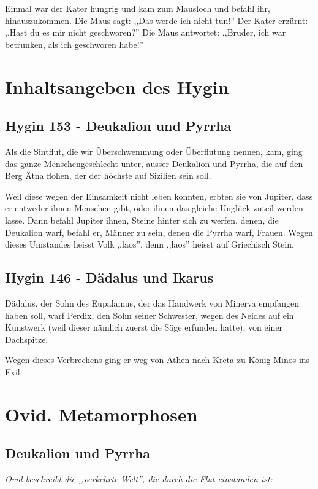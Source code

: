 \documentclass[a4paper]{article}
\begin{document}
Einmal war der Kater hungrig und kam zum Mausloch und befahl ihr, hinauszukommen. Die Maus sagt: ,,Das werde ich nicht tun!'' Der Kater erzürnt: ,,Hast du es mir nicht geschworen?'' Die Maus antwortet: ,,Bruder, ich war betrunken, als ich geschworen habe!''

\section{Inhaltsangeben des Hygin}
\subsection{Hygin 153 - Deukalion und Pyrrha}
Als die Sintflut, die wir Überschwemmung oder Überflutung nennen, kam, ging das ganze Menschengeschlecht unter, ausser Deukalion und Pyrrha, die auf den Berg Ätna flohen, der der höchste auf Sizilien sein soll.

Weil diese wegen der Einsamkeit nicht leben konnten, erbten sie von Jupiter, dass er entweder ihnen Menschen gibt, oder ihnen das gleiche Unglück zuteil werden lasse. Dann befahl Jupiter ihnen, Steine hinter sich zu werfen, denen, die Deukalion warf, befahl er, Männer zu sein, denen die Pyrrha warf, Frauen. Wegen dieses Umstandes heisst Volk ,,laos'', denn ,,laos'' heisst auf Griechisch Stein.
\subsection{Hygin 146 - Dädalus und Ikarus}
Dädalus, der Sohn des Eupalamus, der das Handwerk von Minerva empfangen haben soll, warf Perdix, den Sohn seiner Schwester, wegen des Neides auf ein Kunstwerk (weil dieser nämlich zuerst die Säge erfunden hatte), von einer Dachspitze.

Wegen dieses Verbrechens ging er weg von Athen nach Kreta zu König Minos ins Exil.

\section{Ovid. Metamorphosen}
\subsection{Deukalion und Pyrrha}
\textit{Ovid beschreibt die ,,verkehrte Welt'', die durch die Flut einstanden ist: }
\end{document}
